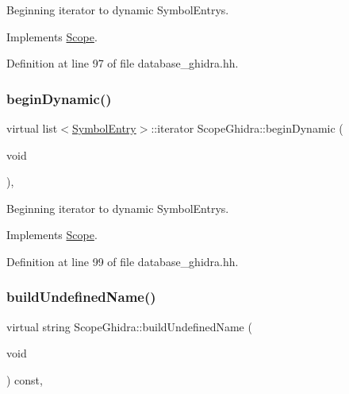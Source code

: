 Beginning iterator to dynamic Symbol\+Entrys. 



Implements \mbox{\hyperlink{class_scope_aab0f92c9d85a20b77b562e5a499b9e6d}{Scope}}.



Definition at line 97 of file database\+\_\+ghidra.\+hh.

\mbox{\label{class_scope_ghidra_a9c510456a060e6bbfb503f7e861afd2e}} 
\subsubsection{\texorpdfstring{beginDynamic()}{beginDynamic()}\hspace{0.1cm}{\footnotesize\ttfamily [2/2]}}
{\footnotesize\ttfamily virtual list$<$\mbox{\hyperlink{class_symbol_entry}{Symbol\+Entry}}$>$\+::iterator Scope\+Ghidra\+::begin\+Dynamic (\begin{DoxyParamCaption}\item[{void}]{ }\end{DoxyParamCaption})\hspace{0.3cm}{\ttfamily [inline]}, {\ttfamily [virtual]}}



Beginning iterator to dynamic Symbol\+Entrys. 



Implements \mbox{\hyperlink{class_scope_a883ad2607f2c7859b49b45100c2c0011}{Scope}}.



Definition at line 99 of file database\+\_\+ghidra.\+hh.

\mbox{\label{class_scope_ghidra_a25f55a3495b08a4caafaaeb5c1cf8bed}} 
\subsubsection{\texorpdfstring{buildUndefinedName()}{buildUndefinedName()}}
{\footnotesize\ttfamily virtual string Scope\+Ghidra\+::build\+Undefined\+Name (\begin{DoxyParamCaption}\item[{void}]{ }\end{DoxyParamCaption}) const\hspace{0.3cm}{\ttfamily [inline]}, {\ttfamily [virtual]}}



